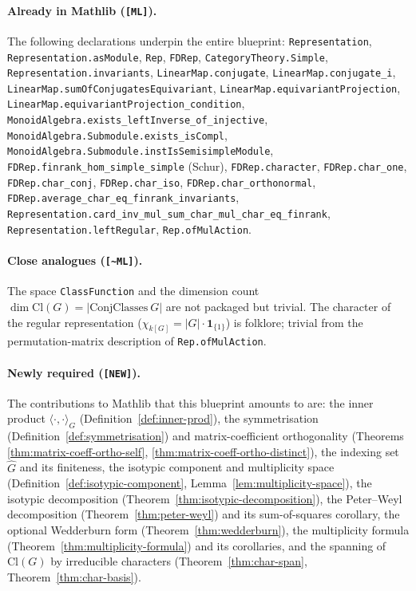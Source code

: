 \paragraph{Already in Mathlib (\texttt{[ML]}).}
The following declarations underpin the entire blueprint:
\texttt{Representation}, \texttt{Representation.asModule}, \texttt{Rep},
\texttt{FDRep}, \texttt{CategoryTheory.Simple},
\texttt{Representation.invariants},
\texttt{LinearMap.conjugate}, \texttt{LinearMap.conjugate\_i},
\texttt{LinearMap.sumOfConjugatesEquivariant},
\texttt{LinearMap.equivariantProjection},
\texttt{LinearMap.equivariantProjection\_condition},
\texttt{MonoidAlgebra.exists\_leftInverse\_of\_injective},
\texttt{MonoidAlgebra.Submodule.exists\_isCompl},
\texttt{MonoidAlgebra.Submodule.instIsSemisimpleModule},
\texttt{FDRep.finrank\_hom\_simple\_simple} (Schur),
\texttt{FDRep.character}, \texttt{FDRep.char\_one},
\texttt{FDRep.char\_conj}, \texttt{FDRep.char\_iso},
\texttt{FDRep.char\_orthonormal},
\texttt{FDRep.average\_char\_eq\_finrank\_invariants},
\texttt{Representation.card\_inv\_mul\_sum\_char\_mul\_char\_eq\_finrank},
\texttt{Representation.leftRegular}, \texttt{Rep.ofMulAction}.

\paragraph{Close analogues (\texttt{[\textasciitilde ML]}).}
The space \texttt{ClassFunction} and the dimension count
$\dim \mathrm{Cl}(G) = |\mathrm{ConjClasses}\ G|$ are not packaged but
trivial. The character of the regular representation
($\chi_{k[G]} = |G|\cdot\mathbf{1}_{\{1\}}$) is folklore; trivial from the
permutation-matrix description of \texttt{Rep.ofMulAction}.

\paragraph{Newly required (\texttt{[NEW]}).}
The contributions to Mathlib that this blueprint amounts to are:
the inner product $\langle\cdot,\cdot\rangle_G$
(Definition~\ref{def:inner-prod}), the symmetrisation
(Definition~\ref{def:symmetrisation}) and matrix-coefficient orthogonality
(Theorems \ref{thm:matrix-coeff-ortho-self}, \ref{thm:matrix-coeff-ortho-distinct}),
the indexing set $\hat G$ and its finiteness, the isotypic component and
multiplicity space (Definition~\ref{def:isotypic-component},
Lemma~\ref{lem:multiplicity-space}), the isotypic decomposition
(Theorem~\ref{thm:isotypic-decomposition}),
the Peter–Weyl decomposition (Theorem~\ref{thm:peter-weyl}) and its
sum-of-squares corollary, the optional Wedderburn form
(Theorem~\ref{thm:wedderburn}), the multiplicity formula
(Theorem~\ref{thm:multiplicity-formula}) and its corollaries, and the spanning
of $\mathrm{Cl}(G)$ by irreducible characters
(Theorem~\ref{thm:char-span}, Theorem~\ref{thm:char-basis}).
